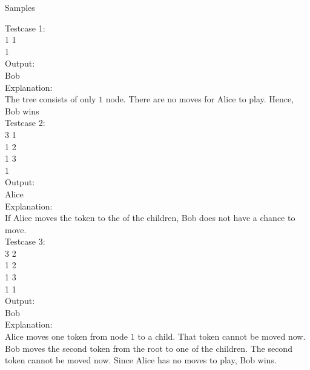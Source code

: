 \documentclass[a4 paper]{article}
\begin{document}
\begin{section}{Samples}

Testcase 1: \\ 
1 1 \\
1 \\

Output:  \\
Bob \\

Explanation: \\
The tree consists of only $1$ node. There are no moves for Alice to play. Hence, Bob wins \\

Testcase 2: \\
3 1 \\
1 2 \\
1 3 \\
1 \\

Output: \\
Alice \\

Explanation: \\
If Alice moves the token to the of the children, Bob does not have a chance to move. \\

Testcase 3: \\
3 2 \\
1 2 \\
1 3 \\
1 1 \\

Output: \\
Bob \\

Explanation: \\
Alice moves one token from node $1$ to a child. That token cannot be moved now. Bob moves the second token from the root to one of the children. The second token cannot be moved now. Since Alice has no moves to play, Bob wins. \\

\end{section}
\end{document}
